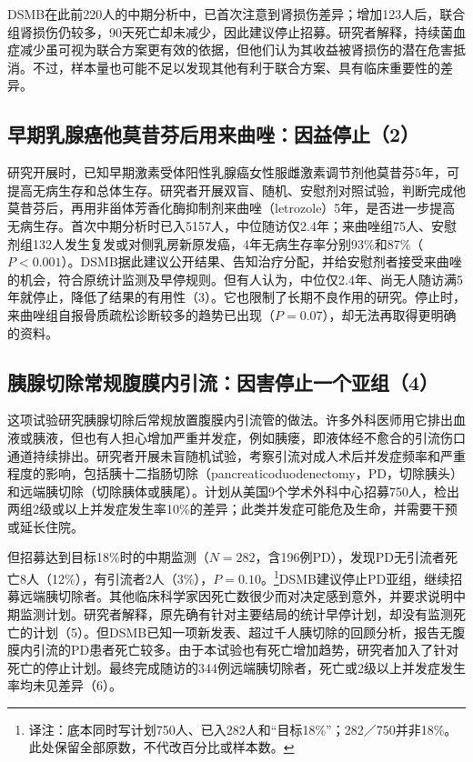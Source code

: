 DSMB在此前220人的中期分析中，已首次注意到肾损伤差异；增加123人后，联合组肾损伤仍较多，90天死亡却未减少，因此建议停止招募。研究者解释，持续菌血症减少虽可视为联合方案更有效的依据，但他们认为其收益被肾损伤的潜在危害抵消。不过，样本量也可能不足以发现其他有利于联合方案、具有临床重要性的差异。

\subsection{早期乳腺癌他莫昔芬后用来曲唑：因益停止（2）}
研究开展时，已知早期激素受体阳性乳腺癌女性服雌激素调节剂他莫昔芬5年，可提高无病生存和总体生存。研究者开展双盲、随机、安慰剂对照试验，判断完成他莫昔芬后，再用非甾体芳香化酶抑制剂来曲唑（letrozole）5年，是否进一步提高无病生存。首次中期分析时已入5157人，中位随访仅2.4年；来曲唑组75人、安慰剂组132人发生复发或对侧乳房新原发癌，4年无病生存率分别93\%和87\%（$P<0.001$）。DSMB据此建议公开结果、告知治疗分配，并给安慰剂者接受来曲唑的机会，符合原统计监测及早停规则。但有人认为，中位仅2.4年、尚无人随访满5年就停止，降低了结果的有用性（3）。它也限制了长期不良作用的研究。停止时，来曲唑组自报骨质疏松诊断较多的趋势已出现（$P=0.07$），却无法再取得更明确的资料。

\subsection{胰腺切除常规腹膜内引流：因害停止一个亚组（4）}
这项试验研究胰腺切除后常规放置腹膜内引流管的做法。许多外科医师用它排出血液或胰液，但也有人担心增加严重并发症，例如胰瘘，即液体经不愈合的引流伤口通道持续排出。研究者开展未盲随机试验，考察引流对成人术后并发症频率和严重程度的影响，包括胰十二指肠切除（pancreaticoduodenectomy，PD，切除胰头）和远端胰切除（切除胰体或胰尾）。计划从美国9个学术外科中心招募750人，检出两组2级或以上并发症发生率10\%的差异；此类并发症可能危及生命，并需要干预或延长住院。

但招募达到目标18\%时的中期监测（$N=282$，含196例PD），发现PD无引流者死亡8人（12\%），有引流者2人（3\%），$P=0.10$。\footnote{译注：底本同时写计划750人、已入282人和“目标18\%”；282／750并非18\%。此处保留全部原数，不代改百分比或样本数。}DSMB建议停止PD亚组，继续招募远端胰切除者。其他临床科学家因死亡数很少而对决定感到意外，并要求说明中期监测计划。研究者解释，原先确有针对主要结局的统计早停计划，却没有监测死亡的计划（5）。但DSMB已知一项新发表、超过千人胰切除的回顾分析，报告无腹膜内引流的PD患者死亡较多。由于本试验也有死亡增加趋势，研究者加入了针对死亡的停止计划。最终完成随访的344例远端胰切除者，死亡或2级以上并发症发生率均未见差异（6）。

